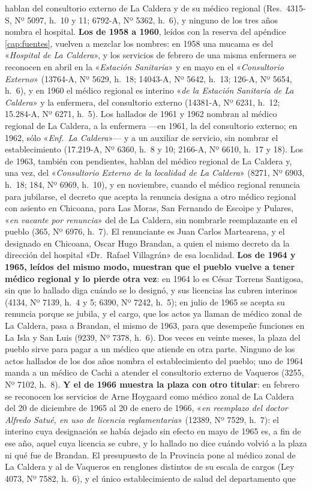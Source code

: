 \begin{cautela}
hablan del consultorio externo de La Caldera y de su médico regional (Res.\ 4315-S, Nº 5097, h.\ 10 y 11; 6792-A, Nº 5362, h.\ 6), y ninguno de los tres años nombra el hospital. \textbf{Los de 1958 a 1960}, leídos con la reserva del apéndice \ref{cap:fuentes}, vuelven a mezclar los nombres: en 1958 una mucama es del «\textit{Hospital de La Caldera}», y los servicios de febrero de una misma enfermera se reconocen en abril en la «\textit{Estación Sanitaria}» y en mayo en el «\textit{Consultorio Externo}» (13764-A, Nº 5629, h.\ 18; 14043-A, Nº 5642, h.\ 13; 126-A, Nº 5654, h.\ 6), y en 1960 el médico regional es interino «\textit{de la Estación Sanitaria de La Caldera}» y la enfermera, del consultorio externo (14381-A, Nº 6231, h.\ 12; 15.284-A, Nº 6271, h.\ 5). Los hallados de 1961 y 1962 nombran al médico regional de La Caldera, a la enfermera ---en 1961, la del consultorio externo; en 1962, sólo «\textit{Enf.\ La Caldera}»--- y a un auxiliar de servicio, sin nombrar el establecimiento (17.219-A, Nº 6360, h.\ 8 y 10; 2166-A, Nº 6610, h.\ 17 y 18). Los de 1963, también con pendientes, hablan del médico regional de La Caldera y, una vez, del «\textit{Consultorio Externo de la localidad de La Caldera}» (8271, Nº 6903, h.\ 18; 184, Nº 6969, h.\ 10), y en noviembre, cuando el médico regional renuncia para jubilarse, el decreto que acepta la renuncia designa a otro médico regional con asiento en Chicoana, para Las Moras, San Fernando de Escoipe y Pulares, «\textit{en vacante por renuncia}» del de La Caldera, sin nombrarle reemplazante en el pueblo (365, Nº 6976, h.\ 7). El renunciante es Juan Carlos Martearena, y el designado en Chicoana, Oscar Hugo Brandan, a quien el mismo decreto da la dirección del hospital «Dr.\ Rafael Villagrán» de esa localidad. \textbf{Los de 1964 y 1965, leídos del mismo modo, muestran que el pueblo vuelve a tener médico regional y lo pierde otra vez}: en 1964 lo es César Torrens Santigosa, sin que lo hallado diga cuándo se lo designó, y sus licencias las cubren interinos (4134, Nº 7139, h.\ 4 y 5; 6390, Nº 7242, h.\ 5); en julio de 1965 se acepta su renuncia porque se jubila, y el cargo, que los actos ya llaman de médico zonal de La Caldera, pasa a Brandan, el mismo de 1963, para que desempeñe funciones en La Isla y San Luis (9239, Nº 7378, h.\ 6). Dos veces en veinte meses, la plaza del pueblo sirve para pagar a un médico que atiende en otra parte. Ninguno de los actos hallados de los dos años nombra el establecimiento del pueblo; uno de 1964 manda a un médico de Cachi a atender el consultorio externo de Vaqueros (3255, Nº 7102, h.\ 8). \textbf{Y el de 1966 muestra la plaza con otro titular}: en febrero se reconocen los servicios de Arne Hoygaard como médico zonal de La Caldera del 20 de diciembre de 1965 al 20 de enero de 1966, «\textit{en reemplazo del doctor Alfredo Satué, en uso de licencia reglamentaria}» (12389, Nº 7529, h.\ 7): el interino cuya designación se había dejado sin efecto en mayo de 1965 es, a fin de ese año, aquel cuya licencia se cubre, y lo hallado no dice cuándo volvió a la plaza ni qué fue de Brandan. El presupuesto de la Provincia pone al médico zonal de La Caldera y al de Vaqueros en renglones distintos de su escala de cargos (Ley 4073, Nº 7582, h.\ 6), y el único establecimiento de salud del departamento que 
\end{cautela}
